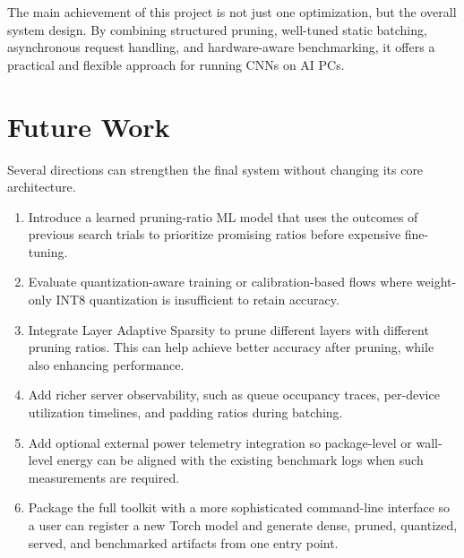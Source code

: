 \documentclass[conference]{IEEEtran}
\begin{document}
The main achievement of this project is not just one optimization, but the overall system design. By combining structured pruning, well-tuned static batching, asynchronous request handling, and hardware-aware benchmarking, it offers a practical and flexible approach for running CNNs on AI PCs.

\section{Future Work}
Several directions can strengthen the final system without changing its core architecture.

\begin{enumerate}
\item Introduce a learned pruning-ratio ML model that uses the outcomes of previous search trials to prioritize promising ratios before expensive fine-tuning.\
\item Evaluate quantization-aware training or calibration-based flows where weight-only INT8 quantization is insufficient to retain accuracy.
\item Integrate Layer Adaptive Sparsity to prune different layers with different pruning ratios. This can help achieve better accuracy after pruning, while also enhancing performance.
\item Add richer server observability, such as queue occupancy traces, per-device utilization timelines, and padding ratios during batching.
\item Add optional external power telemetry integration so package-level or wall-level energy can be aligned with the existing benchmark logs when such measurements are required.
\item Package the full toolkit with a more sophisticated command-line interface so a user can register a new Torch model and generate dense, pruned, quantized, served, and benchmarked artifacts from one entry point.
\end{enumerate}



\end{document}
